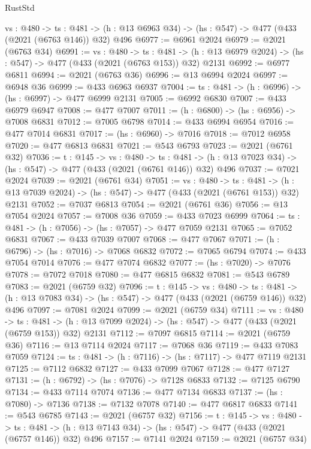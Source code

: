 \begin{lexlean}{RustStd}
\begin{coremodule}
{\begin{coremodule}
{{{{{{{{{{{{{{{{  {vs : @480} ->
  {ts : @481} -> (h : @13 @6963 @34) -> (hs : @547) -> @477 (@433 (@2021 (@6763 @146)) @32) @496
@6977 := @6961 @2024
@6979 := @2021 (@6763 @34)
@6991 := {vs : @480} ->
  {ts : @481} -> (h : @13 @6979 @2024) -> (hs : @547) -> @477 (@433 (@2021 (@6763 @153)) @32) @2131
@6992 := @6977 @6811
@6994 := @2021 (@6763 @36)
@6996 := @13 @6994 @2024
@6997 := @6948 @36
@6999 := @433 @6963 @6937
@7004 := {ts : @481} -> (h : @6996) -> (hs : @6997) -> @477 @6999 @2131
@7005 := @6992 @6830
@7007 := @433 @6979 @6947
@7008 := @477 @7007
@7011 := (h : @6800) -> (hs : @6956) -> @7008 @6831
@7012 := @7005 @6798
@7014 := @433 @6994 @6954
@7016 := @477 @7014 @6831
@7017 := (hs : @6960) -> @7016
@7018 := @7012 @6958
@7020 := @477 @6813 @6831
@7021 := @543 @6793
@7023 := @2021 (@6761 @32)
@7036 := {t : @145} ->
  {vs : @480} ->
  {ts : @481} -> (h : @13 @7023 @34) -> (hs : @547) -> @477 (@433 (@2021 (@6761 @146)) @32) @496
@7037 := @7021 @2024
@7039 := @2021 (@6761 @34)
@7051 := {vs : @480} ->
  {ts : @481} -> (h : @13 @7039 @2024) -> (hs : @547) -> @477 (@433 (@2021 (@6761 @153)) @32) @2131
@7052 := @7037 @6813
@7054 := @2021 (@6761 @36)
@7056 := @13 @7054 @2024
@7057 := @7008 @36
@7059 := @433 @7023 @6999
@7064 := {ts : @481} -> (h : @7056) -> (hs : @7057) -> @477 @7059 @2131
@7065 := @7052 @6831
@7067 := @433 @7039 @7007
@7068 := @477 @7067
@7071 := (h : @6796) -> (hs : @7016) -> @7068 @6832
@7072 := @7065 @6794
@7074 := @433 @7054 @7014
@7076 := @477 @7074 @6832
@7077 := (hs : @7020) -> @7076
@7078 := @7072 @7018
@7080 := @477 @6815 @6832
@7081 := @543 @6789
@7083 := @2021 (@6759 @32)
@7096 := {t : @145} ->
  {vs : @480} ->
  {ts : @481} -> (h : @13 @7083 @34) -> (hs : @547) -> @477 (@433 (@2021 (@6759 @146)) @32) @496
@7097 := @7081 @2024
@7099 := @2021 (@6759 @34)
@7111 := {vs : @480} ->
  {ts : @481} -> (h : @13 @7099 @2024) -> (hs : @547) -> @477 (@433 (@2021 (@6759 @153)) @32) @2131
@7112 := @7097 @6815
@7114 := @2021 (@6759 @36)
@7116 := @13 @7114 @2024
@7117 := @7068 @36
@7119 := @433 @7083 @7059
@7124 := {ts : @481} -> (h : @7116) -> (hs : @7117) -> @477 @7119 @2131
@7125 := @7112 @6832
@7127 := @433 @7099 @7067
@7128 := @477 @7127
@7131 := (h : @6792) -> (hs : @7076) -> @7128 @6833
@7132 := @7125 @6790
@7134 := @433 @7114 @7074
@7136 := @477 @7134 @6833
@7137 := (hs : @7080) -> @7136
@7138 := @7132 @7078
@7140 := @477 @6817 @6833
@7141 := @543 @6785
@7143 := @2021 (@6757 @32)
@7156 := {t : @145} ->
  {vs : @480} ->
  {ts : @481} -> (h : @13 @7143 @34) -> (hs : @547) -> @477 (@433 (@2021 (@6757 @146)) @32) @496
@7157 := @7141 @2024
@7159 := @2021 (@6757 @34)
}}}}}}}}}}}}}}}}
\end{coremodule}}
\end{coremodule}
\end{lexlean}
